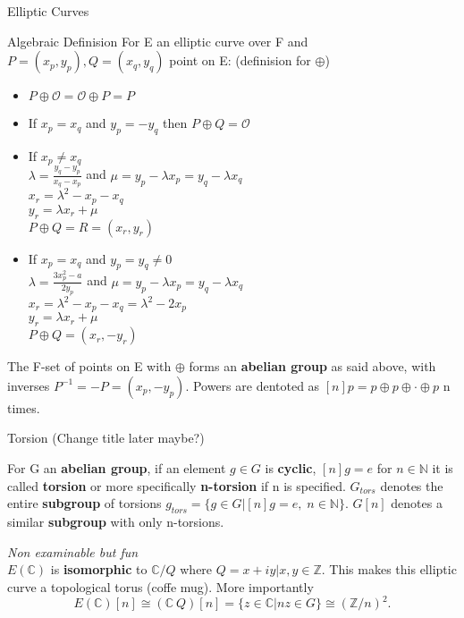 \documentclass[12pt, letterpaper]{article}
\begin{document}
\begin{section}{Elliptic Curves}
\begin{subsection}{Algebraic Definision}
    For E an elliptic curve over F and \(P = (x_{p}, y_{p}),
    Q = (x_{q}, y_{q})\) point on E: (definision for \(\oplus\))
    \begin{itemize}
      \item \(P \oplus \mathcal{O} = \mathcal{O} \oplus P = P\)
      \item If \(x_{p} = x_{q}\) and \(y_{p} = -y_{q}\) then
            \(P \oplus Q = \mathcal{O}\)
      \item If \(x_{p} \neq x_{q}\) \\
            \(\lambda = \frac{y_{q} - y_{p}}{x_{q} - x_{p}}\) and
            \(\mu = y_{p} - \lambda x_{p} = y_{q} - \lambda x_{q}\) \\
            \(x_{r} = \lambda^{2} - x_{p} - x_{q}\) \\
            \(y_{r} = \lambda x_{r} + \mu\) \\
            \(P \oplus Q = R = (x_{r}, y_{r})\)
      \item If \(x_{p} = x_{q}\) and \(y_{p} = y_{q} \neq 0\) \\
            \(\lambda = \frac{3x^{2}_{p} - a}{2y_{p}}\) and
            \(\mu = y_{p} - \lambda x_{p} = y_{q} - \lambda x_{q}\) \\
            \(x_{r} = \lambda^{2} - x_{p} - x_{q} = \lambda^{2} - 2x_{p}\) \\
            \(y_{r} = \lambda x_{r} + \mu\) \\
            \(P \oplus Q = (x_{r}, -y_{r})\)
    \end{itemize}

    The F-set of points on E with \(\oplus\) forms an \textbf{abelian group} as
    said above, with inverses \(P^{-1} = -P = (x_{p}, -y_{p})\). Powers are
    dentoted as \([n]p = p \oplus p \oplus \cdot \oplus p\) n times.

  \end{subsection}

  \begin{subsection}{Torsion (Change title later maybe?)}

    For G an \textbf{abelian group}, if an element \(g \in G\) is
    \textbf{cyclic}, \([n]g = e\) for \(n \in \mathbb{N}\) it is called
    \textbf{torsion} or more specifically \textbf{n-torsion} if n is specified.
    \(G_{tors}\) denotes the entire \textbf{subgroup} of torsions
    \(g_{tors} = \{g \in G | [n]g = e, \; n \in \mathbb{N}\}\). \(G[n]\)
    denotes a similar \textbf{subgroup} with only n-torsions.

    \textit{Non examinable but fun} \\
    \(E(\mathbb{C})\) is \textbf{isomorphic} to \(\mathbb{C} / Q\) where
    \(Q = {x + iy | x, y \in \mathbb{Z}}\). This makes this elliptic curve a
    topological torus (coffe mug). More importantly
    \[E(\mathbb{C})[n] \cong (\mathbb{C} \ Q)[n] = \{z \in \mathbb{C}
      | nz \in G\} \cong (\mathbb{Z} / n){}^{2}.\]

  \end{subsection}

\end{section}
\end{document}
